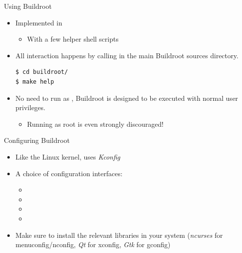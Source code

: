 \begin{frame}[fragile]{Using Buildroot}
  \begin{itemize}
  \item Implemented in 
    \begin{itemize}
    \item With a few helper shell scripts
    \end{itemize}
  \item All interaction happens by calling  in the main Buildroot
    sources directory.
    \begin{block}{}
\begin{verbatim}
$ cd buildroot/
$ make help
\end{verbatim}
    \end{block}
  \item No need to run as , Buildroot is designed to be
    executed with normal user privileges.
    \begin{itemize}
    \item Running as root is even strongly discouraged!
    \end{itemize}
  \end{itemize}
\end{frame}

\begin{frame}{Configuring Buildroot}
  \begin{itemize}
  \item Like the Linux kernel, uses {\em Kconfig}
  \item A choice of configuration interfaces:
    \begin{itemize}
    \item {}
    \item {}
    \item {}
    \item {}
    \end{itemize}
  \item Make sure to install the relevant libraries in your system
    ({\em ncurses} for menuconfig/nconfig, {\em Qt} for xconfig, {\em
      Gtk} for gconfig)
  \end{itemize}
\end{frame}

